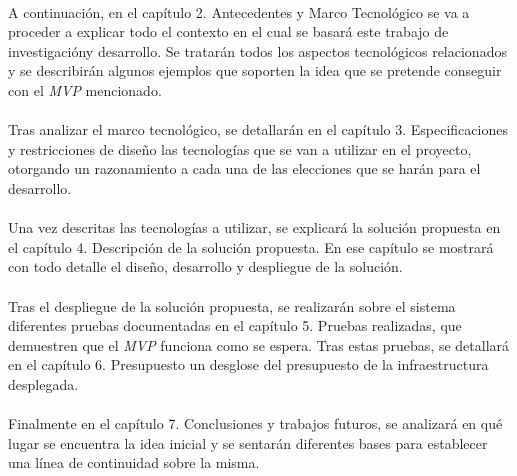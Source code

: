 \documentclass[../../memoria.tex]{subfiles}
\begin{document}
\paragraph{}
A continuación, en el capítulo 2. Antecedentes y Marco Tecnológico se va a proceder a explicar todo el contexto en el cual se basará este trabajo de investigacióny desarrollo. Se tratarán todos los aspectos tecnológicos relacionados y se describirán algunos ejemplos que soporten la idea que se pretende conseguir con el \textit{MVP} mencionado.

\paragraph{}
Tras analizar el marco tecnológico, se detallarán en el capítulo 3. Especificaciones y restricciones de diseño las tecnologías que se van a utilizar en el proyecto, otorgando un razonamiento a cada una de las elecciones que se harán para el desarrollo.

\paragraph{}
Una vez descritas las tecnologías a utilizar, se explicará la solución propuesta en el capítulo 4. Descripción de la solución propuesta. En ese capítulo se mostrará con todo detalle el diseño, desarrollo y despliegue de la solución.

\paragraph{}
Tras el despliegue de la solución propuesta, se realizarán sobre el sistema diferentes pruebas documentadas en el capítulo 5. Pruebas realizadas, que demuestren que el \textit{MVP} funciona como se espera. Tras estas pruebas, se detallará en el capítulo 6. Presupuesto un desglose del presupuesto de la infraestructura desplegada.

\paragraph{}
Finalmente en el capítulo 7. Conclusiones y trabajos futuros, se analizará en qué lugar se encuentra la idea inicial y se sentarán diferentes bases para establecer una línea de continuidad sobre la misma.
\end{document}
